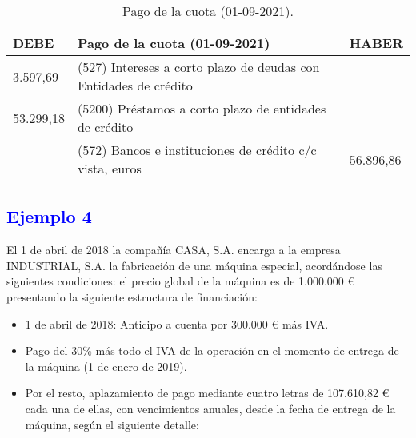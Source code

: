 \begin{table}[H]
    \centering
    \begin{tabular}{|p{2cm}|p{6cm}|p{2cm}|}
        \hline
        \rowcolor{blue!30}
        \textbf{DEBE} & \textbf{Pago de la cuota (01-09-2021)} & \textbf{HABER} \\
        \hline
        3.597,69 & (527) Intereses a corto plazo de deudas con Entidades de crédito & \\
        \hline
        53.299,18 & (5200) Préstamos a corto plazo de entidades de crédito & \\
        \hline
        & (572) Bancos e instituciones de crédito c/c vista, euros & 56.896,86 \\
        \hline
    \end{tabular}
    \caption{Pago de la cuota (01-09-2021).}
    \label{tabla:pago_cuota_2021}
\end{table}
\newpage
\subsection*{\textcolor{blue}{Ejemplo 4}}

El 1 de abril de 2018 la compañía CASA, S.A. encarga a la empresa INDUSTRIAL, S.A. la fabricación de una máquina especial, acordándose las siguientes condiciones: el precio global de la máquina es de 1.000.000 € presentando la siguiente estructura de financiación:

\begin{itemize}
    \item 1 de abril de 2018: Anticipo a cuenta por 300.000 € más IVA.
    \item Pago del 30\% más todo el IVA de la operación en el momento de entrega de la máquina (1 de enero de 2019).
    \item Por el resto, aplazamiento de pago mediante cuatro letras de 107.610,82 € cada una de ellas, con vencimientos anuales, desde la fecha de entrega de la máquina, según el siguiente detalle:
\end{itemize}

